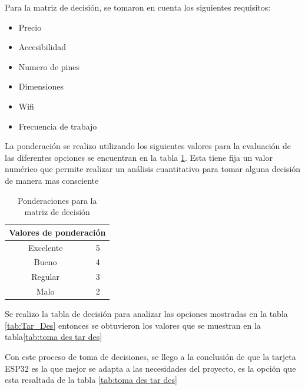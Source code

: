 Para la matriz de decisión, se tomaron en cuenta los siguientes requisitos:

\begin{itemize}
    \item Precio
    \item Accesibilidad
    \item Numero de pines
    \item Dimensiones
    \item Wifi
    \item Frecuencia de trabajo
\end{itemize}

La ponderación se realizo utilizando los siguientes valores para la evaluación de las diferentes opciones se encuentran en la tabla \ref{tab: Val des ap4}. Esta tiene fija un valor numérico que permite realizar un análisis cuantitativo para tomar alguna decisión de manera mas consciente

\begin{table}
    \centering
\caption{Ponderaciones para la matriz de decisión}
\label{tab: Val des ap4}
    \begin{tabular}{|c |c |} \hline 
         \multicolumn{2}{|c|}{Valores de ponderación}\\ \hline
         Excelente& 5\\ \hline
         Bueno& 4\\ \hline
         Regular& 3\\ \hline
 Malo&2\\ \hline
    \end{tabular}  
\end{table}

Se realizo la tabla de decisión para analizar las opciones mostradas en la tabla \ref{tab:Tar_Des} entonces se obtuvieron los valores que se muestran en la tabla\ref{tab:toma des tar des}


\begin{table}
    \centering
\caption{Ejemplo de toma de decisión de la tarjeta de desarrollo}
\label{tab:toma des tar des}
\end{table}

Con este proceso de toma de decisiones, se llego a la conclusión de que la tarjeta ESP32 es la que mejor se adapta a las necesidades del proyecto, es la opción que esta resaltada de la tabla \ref{tab:toma des tar des}
